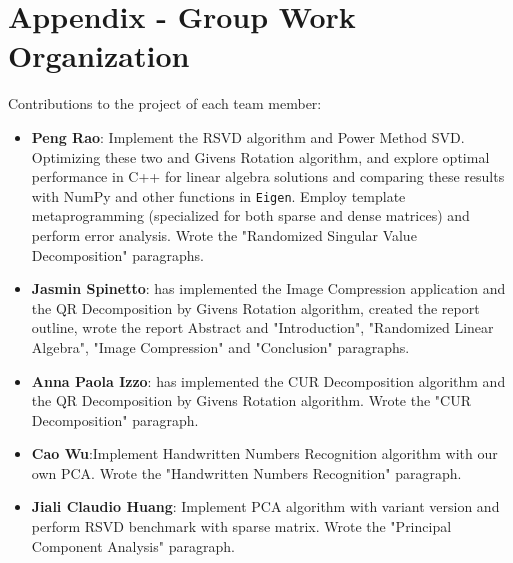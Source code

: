 \documentclass[11pt,a4paper]{article}
\begin{document}
\nocite{*}

\appendix
\section*{Appendix - Group Work Organization}
Contributions to the project of each team member:
\begin{itemize} [label=-]
    \item \textbf{Peng Rao}: Implement the RSVD algorithm and Power Method SVD. Optimizing these two and Givens Rotation algorithm, and explore optimal performance in C++ for linear algebra solutions and comparing these results with NumPy and other functions in \texttt{Eigen}. Employ template metaprogramming (specialized for both sparse and dense matrices) and perform error analysis. Wrote the "Randomized Singular Value Decomposition" paragraphs. 
    \item \textbf{Jasmin Spinetto}: has implemented the Image Compression application and the QR Decomposition by Givens Rotation algorithm, created the report outline, wrote the report Abstract and "Introduction", "Randomized Linear Algebra", "Image Compression" and "Conclusion" paragraphs.
    \item \textbf{Anna Paola Izzo}: has implemented the CUR Decomposition algorithm and the QR Decomposition by Givens Rotation algorithm. Wrote the "CUR Decomposition" paragraph. 
    \item \textbf{Cao Wu}:Implement Handwritten Numbers Recognition algorithm with our own PCA. Wrote the "Handwritten Numbers Recognition" paragraph.
    \item \textbf{Jiali Claudio Huang}: Implement PCA algorithm with variant version and perform RSVD benchmark with sparse matrix. Wrote the "Principal Component Analysis" paragraph.
\end{itemize}
\end{document}
